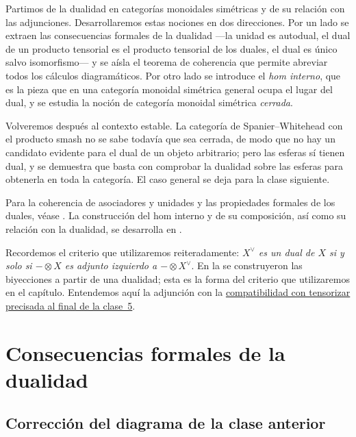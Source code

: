 Partimos de la dualidad en categorías monoidales simétricas y de su relación con las adjunciones. Desarrollaremos estas nociones en dos direcciones. Por un lado se extraen las consecuencias formales de la dualidad —la unidad es autodual, el dual de un producto tensorial es el producto tensorial de los duales, el dual es único salvo isomorfismo— y se aísla el teorema de coherencia que permite abreviar todos los cálculos diagramáticos. Por otro lado se introduce el \emph{hom interno}, que es la pieza que en una categoría monoidal simétrica general ocupa el lugar del dual, y se estudia la noción de categoría monoidal simétrica \emph{cerrada}.

Volveremos después al contexto estable. La categoría de Spanier--Whitehead con el producto smash no se sabe todavía que sea cerrada, de modo que no hay un candidato evidente para el dual de un objeto arbitrario; pero las esferas sí tienen dual, y se demuestra que basta con comprobar la dualidad sobre las esferas para obtenerla en toda la categoría. El caso general se deja para la clase siguiente.

Para la coherencia de asociadores y unidades y las propiedades formales de los duales, véase \cite[\S\S2.9--2.10]{egno2015}. La construcción del hom interno y de su composición, así como su relación con la dualidad, se desarrolla en \cite[\S\S4.1.4--4.2.1]{malkiewich}.

\begin{nota}
   Recordemos el criterio que utilizaremos reiteradamente: \emph{$X^\vee$ es un dual de $X$ si y solo si $-\otimes X$ es adjunto izquierdo a $-\otimes X^\vee$}. En la  se construyeron las biyecciones a partir de una dualidad; esta es la forma del criterio que utilizaremos en el capítulo. Entendemos aquí la adjunción con la \hyperref[nota:compatibilidad-adjuncion-dual]{compatibilidad con tensorizar precisada al final de la clase~5}.
\end{nota}

\section{Consecuencias formales de la dualidad}

\subsection{Corrección del diagrama de la clase anterior}

